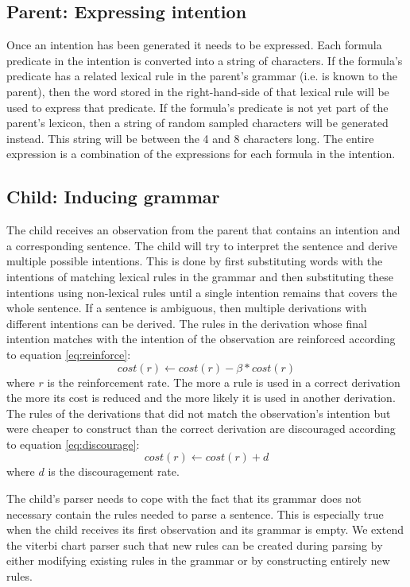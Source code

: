 \documentclass[a4paper]{article}
\begin{document}
\subsection{Parent: Expressing intention}
Once an intention has been generated it needs to be expressed. Each formula predicate in the intention is converted into a string of characters. If the formula's predicate has a related lexical rule in the parent's grammar (i.e. is known to the parent), then the word stored in the right-hand-side of that lexical rule will be used to express that predicate. If the formula's predicate is not yet part of the parent's lexicon, then a string of random sampled characters will be generated instead. This string will be between the 4 and 8 characters long. The entire expression is a combination of the expressions for each formula in the intention.

\subsection{Child: Inducing grammar} %
The child receives an observation from the parent that contains an intention and a corresponding sentence. The child will try to interpret the sentence and derive multiple possible intentions. This is done by first substituting words with the intentions of matching lexical rules in the grammar and then substituting these intentions using non-lexical rules until a single intention remains that covers the whole sentence. If a sentence is ambiguous, then multiple derivations with different intentions can be derived. The rules in the derivation whose final intention matches with the intention of the observation are reinforced according to equation \ref{eq:reinforce}:
\begin{equation}
cost(r) \leftarrow cost(r) - \beta*cost(r)
\label{eq:reinforce}
\end{equation}
where $r$ is the reinforcement rate. The more a rule is used in a correct derivation the more its cost is reduced and the more likely it is used in another derivation. The rules of the derivations that did not match the observation's intention but were cheaper to construct than the correct derivation are discouraged according to equation \ref{eq:discourage}:
\begin{equation}
cost(r) \leftarrow cost(r) + d
\label{eq:discourage}
\end{equation}
where $d$ is the discouragement rate.

The child's parser needs to cope with the fact that its grammar does not necessary contain the rules needed to parse a sentence. This is especially true when the child receives its first observation and its grammar is empty. We extend the viterbi chart parser such that new rules can be created during parsing by either modifying existing rules in the grammar or by constructing entirely new rules. 
\end{document}
